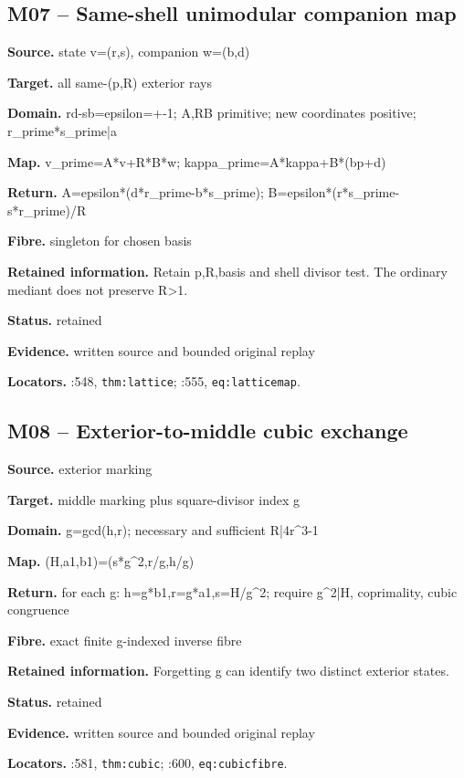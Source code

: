 \subsection*{M07 -- Same-shell unimodular companion map}
\noindent\textbf{Source.} state v=(r,s), companion w=(b,d)\par
\noindent\textbf{Target.} all same-(p,R) exterior rays\par
\noindent\textbf{Domain.} rd-sb=epsilon=+-1; A,RB primitive; new coordinates positive; r\_prime*s\_prime|a\par
\noindent\textbf{Map.} v\_prime=A*v+R*B*w; kappa\_prime=A*kappa+B*(bp+d)\par
\noindent\textbf{Return.} A=epsilon*(d*r\_prime-b*s\_prime); B=epsilon*(r*s\_prime-s*r\_prime)/R\par
\noindent\textbf{Fibre.} singleton for chosen basis\par
\noindent\textbf{Retained information.} Retain p,R,basis and shell divisor test. The ordinary mediant does not preserve R>1.\par
\noindent\textbf{Status.} retained\par
\noindent\textbf{Evidence.} written source and bounded original replay\par
\noindent\textbf{Locators.} :548, \texttt{thm:lattice}; :555, \texttt{eq:latticemap}.
\subsection*{M08 -- Exterior-to-middle cubic exchange}
\noindent\textbf{Source.} exterior marking\par
\noindent\textbf{Target.} middle marking plus square-divisor index g\par
\noindent\textbf{Domain.} g=gcd(h,r); necessary and sufficient R|4r\textasciicircum{}3-1\par
\noindent\textbf{Map.} (H,a1,b1)=(s*g\textasciicircum{}2,r/g,h/g)\par
\noindent\textbf{Return.} for each g: h=g*b1,r=g*a1,s=H/g\textasciicircum{}2; require g\textasciicircum{}2|H, coprimality, cubic congruence\par
\noindent\textbf{Fibre.} exact finite g-indexed inverse fibre\par
\noindent\textbf{Retained information.} Forgetting g can identify two distinct exterior states.\par
\noindent\textbf{Status.} retained\par
\noindent\textbf{Evidence.} written source and bounded original replay\par
\noindent\textbf{Locators.} :581, \texttt{thm:cubic}; :600, \texttt{eq:cubicfibre}.
